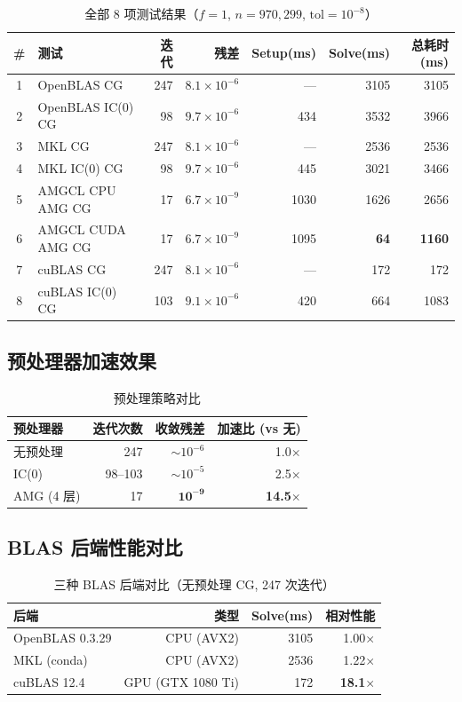 \documentclass[12pt,a4paper]{ctexart}
\begin{document}
\begin{table}[htbp]
\centering
\caption{全部 8 项测试结果（$f=1$, $n=970{,}299$, $\mathrm{tol}=10^{-8}$）}
\label{tab:results}
\begin{tabular}{clrrrrr}
\toprule
\# & 测试 & 迭代 & 残差 & Setup(ms) & Solve(ms) & 总耗时(ms) \\
\midrule
1 & OpenBLAS CG & 247 & $8.1\times10^{-6}$ & — & 3105 & 3105 \\
2 & OpenBLAS IC(0) CG & 98 & $9.7\times10^{-6}$ & 434 & 3532 & 3966 \\
3 & MKL CG & 247 & $8.1\times10^{-6}$ & — & 2536 & 2536 \\
4 & MKL IC(0) CG & 98 & $9.7\times10^{-6}$ & 445 & 3021 & 3466 \\
5 & AMGCL CPU AMG CG & 17 & $6.7\times10^{-9}$ & 1030 & 1626 & 2656 \\
6 & AMGCL CUDA AMG CG & 17 & $6.7\times10^{-9}$ & 1095 & \textbf{64} & \textbf{1160} \\
7 & cuBLAS CG & 247 & $8.1\times10^{-6}$ & — & 172 & 172 \\
8 & cuBLAS IC(0) CG & 103 & $9.1\times10^{-6}$ & 420 & 664 & 1083 \\
\bottomrule
\end{tabular}
\end{table}

\subsection{预处理器加速效果}

\begin{table}[htbp]
\centering
\caption{预处理策略对比}
\label{tab:precond}
\begin{tabular}{lrrr}
\toprule
预处理器 & 迭代次数 & 收敛残差 & 加速比 (vs 无) \\
\midrule
无预处理 & 247 & $\sim10^{-6}$ & 1.0$\times$ \\
IC(0) & 98–103 & $\sim10^{-5}$ & 2.5$\times$ \\
AMG (4 层) & 17 & $\mathbf{10^{-9}}$ & \textbf{14.5$\times$} \\
\bottomrule
\end{tabular}
\end{table}

\subsection{BLAS 后端性能对比}

\begin{table}[htbp]
\centering
\caption{三种 BLAS 后端对比（无预处理 CG, 247 次迭代）}
\label{tab:blas}
\begin{tabular}{lrrr}
\toprule
后端 & 类型 & Solve(ms) & 相对性能 \\
\midrule
OpenBLAS 0.3.29 & CPU (AVX2) & 3105 & 1.00$\times$ \\
MKL (conda) & CPU (AVX2) & 2536 & 1.22$\times$ \\
cuBLAS 12.4 & GPU (GTX 1080 Ti) & 172 & \textbf{18.1$\times$} \\
\bottomrule
\end{tabular}
\end{table}
\end{document}
